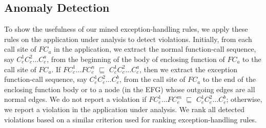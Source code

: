 \subsection{Anomaly Detection}

To show the usefulness of our mined exception-handling rules, we apply these
rules on the application under analysis to detect violations. Initially, from each
call site of $FC_a$ in the application, we extract the normal function-call 
sequence, say $C_c^1$$C_c^2$$\ldots$$C_c^a$, from the beginning of 
the body of enclosing function of $FC_a$ to the call site of $FC_a$.
If $FC_c^1$$\dots$$FC_c^n$ $\sqsubseteq$ $C_c^1$$C_c^2$$\ldots$$C_c^a$,
then we extract the exception function-call sequence, say $C_e^1$$C_e^2$$\ldots$$C_e^b$,
from the call site of $FC_a$ to the end of the enclosing function body 
or to a node (in the EFG) whose outgoing edges are all normal edges.
We do not report a violation if $FC_e^1$$\ldots$$FC_e^m$ $\sqsubseteq$ $C_e^1$$C_e^2$$\ldots$$C_e^b$;
otherwise, we report a violation in the application under analysis.
We rank all detected violations based on 
a similar criterion used for ranking exception-handling rules. 

